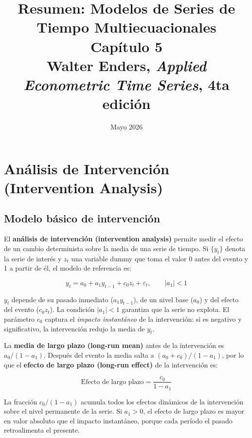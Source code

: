 \documentclass[12pt]{article}
\title{\textbf{Resumen: Modelos de Series de Tiempo Multiecuacionales}\\
\large Cap\'itulo 5\\
\normalsize Walter Enders, \textit{Applied Econometric Time Series}, 4ta edici\'on}
\author{}
\date{Mayo 2026}
\begin{document}
\maketitle
\tableofcontents
\newpage

\section{An\'alisis de Intervenci\'on (Intervention Analysis)}

\subsection{Modelo b\'asico de intervenci\'on}

El \textbf{an\'alisis de intervenci\'on (intervention analysis)} permite medir el efecto de un cambio determinista sobre la media de una serie de tiempo. Si $\{y_t\}$ denota la serie de inter\'es y $z_t$ una variable dummy que toma el valor 0 antes del evento y 1 a partir de \'el, el modelo de referencia es:

\begin{equation}
y_t = a_0 + a_1 y_{t-1} + c_0 z_t + \varepsilon_t, \qquad |a_1| < 1
\end{equation}

\begin{intuicionmat}
$y_t$ depende de su pasado inmediato ($a_1 y_{t-1}$), de un nivel base ($a_0$) y del efecto del evento ($c_0 z_t$). La condici\'on $|a_1|<1$ garantiza que la serie no explota. El par\'ametro $c_0$ captura el \textit{impacto instant\'aneo} de la intervenci\'on: si es negativo y significativo, la intervenci\'on redujo la media de $y_t$.
\end{intuicionmat}

La \textbf{media de largo plazo (long-run mean)} antes de la intervenci\'on es $a_0/(1-a_1)$. Despu\'es del evento la media salta a $(a_0 + c_0)/(1-a_1)$, por lo que el \textbf{efecto de largo plazo (long-run effect)} de la intervenci\'on es:

\begin{equation}
\text{Efecto de largo plazo} = \frac{c_0}{1-a_1}
\end{equation}

\begin{intuicionmat}
La fracci\'on $c_0/(1-a_1)$ acumula todos los efectos din\'amicos de la intervenci\'on sobre el nivel permanente de la serie. Si $a_1 > 0$, el efecto de largo plazo es mayor en valor absoluto que el impacto instant\'aneo, porque cada per\'iodo el pasado retroalimenta el presente.
\end{intuicionmat}
\end{document}
